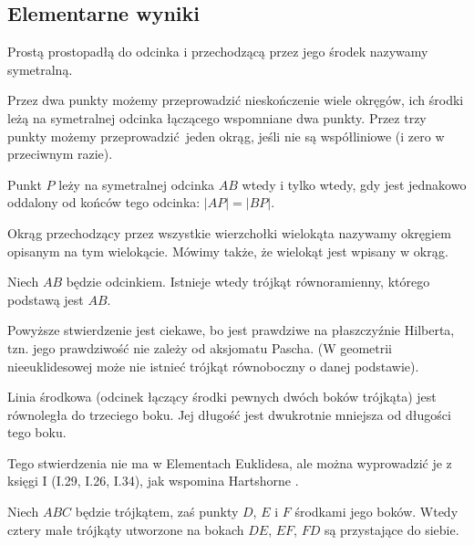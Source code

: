 \subsection{Elementarne wyniki}

\begin{definition}[symetralna]
	Prostą prostopadłą do odcinka i przechodzącą przez jego środek nazywamy symetralną.
\end{definition}
Przez dwa punkty możemy przeprowadzić nieskończenie wiele okręgów, ich środki leżą na symetralnej odcinka łączącego wspomniane dwa punkty.
Przez trzy punkty możemy przeprowadzić jeden okrąg, jeśli nie są współliniowe (i zero w przeciwnym razie).
\begin{proposition} %
	Punkt $P$ leży na symetralnej odcinka $AB$ wtedy i tylko wtedy, gdy jest jednakowo oddalony od końców tego odcinka: $|AP| = |BP|$.
\end{proposition}


Okrąg przechodzący przez wszystkie wierzchołki wielokąta nazywamy okręgiem opisanym na tym wielokącie.
Mówimy także, że wielokąt jest wpisany w okrąg.

\begin{proposition}
	\label{hartshorne_52}
    Niech $AB$ będzie odcinkiem.
	Istnieje wtedy trójkąt równoramienny, którego podstawą jest $AB$.
\end{proposition}

Powyższe stwierdzenie jest ciekawe, bo jest prawdziwe na płaszczyźnie Hilberta, tzn. jego prawdziwość nie zależy od aksjomatu Pascha.
(W geometrii nieeuklidesowej może nie istnieć trójkąt równoboczny o danej podstawie).

\begin{proposition}
	\label{hartshorne_52}
	Linia środkowa (odcinek łączący środki pewnych dwóch boków trójkąta) jest równoległa do trzeciego boku.
    Jej długość jest dwukrotnie mniejsza od długości tego boku.
\end{proposition}

Tego stwierdzenia nie ma w Elementach Euklidesa, ale można wyprowadzić je z księgi I (I.29, I.26, I.34), jak wspomina Hartshorne \cite[s. 52. 53]{hartshorne2000}.

\begin{corollary}
	Niech $ABC$ będzie trójkątem, zaś punkty $D$, $E$ i $F$ środkami jego boków.
	Wtedy cztery małe trójkąty utworzone na bokach $DE$, $EF$, $FD$ są przystające do siebie.
\end{corollary}

